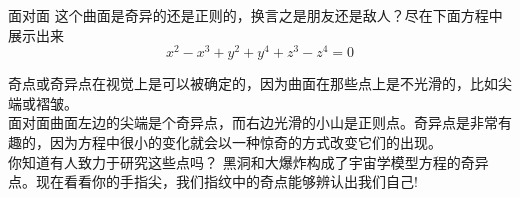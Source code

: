 ﻿\begin{surferPage}{面对面}
这个曲面是奇异的还是正则的，换言之是朋友还是敌人？尽在下面方程中展示出来\\
\smallskip
\[x^2	- x^3+ y^2+ y^4+ z^3- z^4	=  0\]

\vspace{0.3cm}

奇点或奇异点在视觉上是可以被确定的，因为曲面在那些点上是不光滑的，比如尖端或褶皱。\\

\vspace{0.3cm}
面对面曲面左边的尖端是个奇异点，而右边光滑的小山是正则点。奇异点是非常有趣的，因为方程中很小的变化就会以一种惊奇的方式改变它们的出现。 \\

\vspace{0.3cm}
你知道有人致力于研究这些点吗？ 黑洞和大爆炸构成了宇宙学模型方程的奇异点。现在看看你的手指尖，我们指纹中的奇点能够辨认出我们自己!
\end{surferPage}
